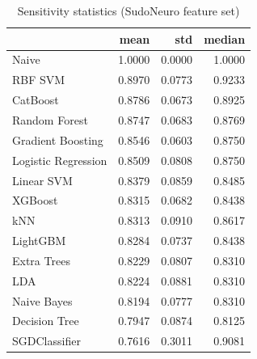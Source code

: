 \begin{table}
\caption{Sensitivity statistics (SudoNeuro feature set)}
\label{tab:sensitivity_SudoNeuro_stats}
\begin{tabular}{lrrr}
\toprule
 & mean & std & median \\
\midrule
Naive & 1.0000 & 0.0000 & 1.0000 \\
RBF SVM & 0.8970 & 0.0773 & 0.9233 \\
CatBoost & 0.8786 & 0.0673 & 0.8925 \\
Random Forest & 0.8747 & 0.0683 & 0.8769 \\
Gradient Boosting & 0.8546 & 0.0603 & 0.8750 \\
Logistic Regression & 0.8509 & 0.0808 & 0.8750 \\
Linear SVM & 0.8379 & 0.0859 & 0.8485 \\
XGBoost & 0.8315 & 0.0682 & 0.8438 \\
kNN & 0.8313 & 0.0910 & 0.8617 \\
LightGBM & 0.8284 & 0.0737 & 0.8438 \\
Extra Trees & 0.8229 & 0.0807 & 0.8310 \\
LDA & 0.8224 & 0.0881 & 0.8310 \\
Naive Bayes & 0.8194 & 0.0777 & 0.8310 \\
Decision Tree & 0.7947 & 0.0874 & 0.8125 \\
SGDClassifier & 0.7616 & 0.3011 & 0.9081 \\
\bottomrule
\end{tabular}
\end{table}
